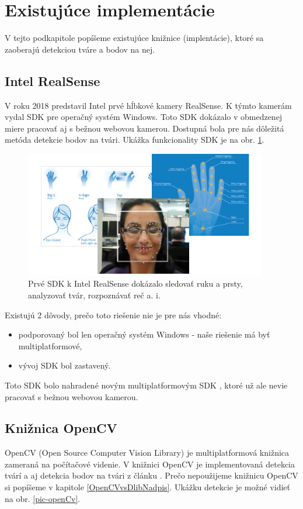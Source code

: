 \section{Existujúce implementácie}
V tejto podkapitole popíšeme existujúce knižnice (implentácie), ktoré sa zaoberajú detekciou tváre a bodov na nej.

\subsection{Intel RealSense}
V roku 2018 predstavil Intel prvé hĺbkové kamery RealSense.
K týmto kamerám vydal SDK \cite{realsensedis} pre operačný systém Windows. 
Toto SDK dokázalo v obmedzenej miere pracovať aj s bežnou webovou kamerou. 
Dostupná bola pre nás dôležitá metóda detekcie bodov na tvári. 
Ukážka funkcionality SDK je na obr. \ref{pic-realsensedis}.

\begin{figure}[H]
	\begin{center}
		\includegraphics[height=5.5cm]{pics/realsensedis.jpg}
		\caption{Prvé SDK k Intel RealSense dokázalo sledovať ruku a prsty, analyzovať tvár, rozpoznávať reč a. i.
		 \cite{realsensedis}}
		\label{pic-realsensedis}
	\end{center}
\end{figure}

Existujú 2 dôvody, prečo toto riešenie nie je pre nás vhodné: 
\begin{itemize}
	\item podporovaný bol len operačný systém Windows - naše riešenie má byť multiplatformové,
	\item vývoj SDK bol zastavený.
\end{itemize}
Toto SDK bolo nahradené novým multiplatformovým SDK \cite{realsensenew}, ktoré už ale nevie pracovať s bežnou webovou kamerou. 

\subsection{Knižnica OpenCV}
OpenCV \cite{openCv} (Open Source Computer Vision Library) je multiplatformová knižnica zameraná na počítačové videnie.
V knižnici OpenCV je implementovaná detekcia tvárí a aj detekcia bodov na tvári z článku \cite{kazemi2014one}. 
Prečo nepoužijeme knižnicu OpenCV si popíšeme v kapitole \ref{OpenCVvsDlibNadpis}. 
Ukážku detekcie je možné vidieť na obr. \ref{pic-openCv}. 

